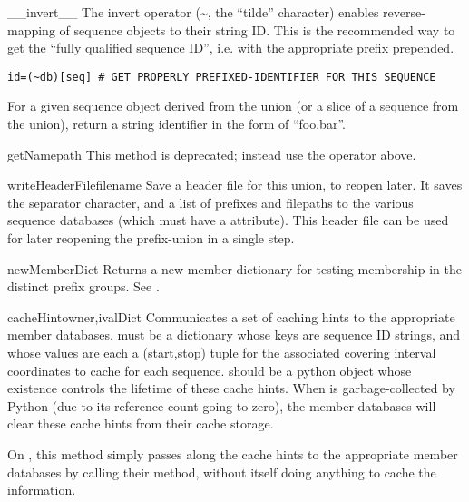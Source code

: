 \documentclass{howto}
\begin{document}
\begin{funcdesc}{__invert__}{}
  The invert operator (\textasciitilde, the ``tilde'' character) 
  enables reverse-mapping of sequence objects to their string ID.
  This is the recommended way to get the ``fully qualified sequence ID'', i.e. with
  the appropriate prefix prepended. 
\begin{verbatim}
id=(~db)[seq] # GET PROPERLY PREFIXED-IDENTIFIER FOR THIS SEQUENCE
\end{verbatim}
  For a given sequence object  derived from the union
  (or a slice of a sequence from the union), return a string identifier
  in the form of ``foo.bar''.  
\end{funcdesc}

\begin{funcdesc}{getName}{path}
  This method is deprecated; instead use the  operator
  above.
\end{funcdesc}

\begin{funcdesc}{writeHeaderFile}{filename}
  Save a header file for this union, to reopen later.
  It saves the separator character, and a list of prefixes
  and filepaths to the various sequence databases (which
  must have a  attribute).  This header
  file can be used for later reopening the prefix-union
  in a single step.
\end{funcdesc}

\begin{funcdesc}{newMemberDict}{}
  Returns a new member dictionary for testing membership in
  the distinct prefix groups.  See .
\end{funcdesc}

\begin{funcdesc}{cacheHint}{owner,ivalDict}
  Communicates a set of caching hints to the appropriate member
  databases.   must be a dictionary whose keys are
  sequence ID strings, and whose values are each a (start,stop) tuple
  for the associated covering interval coordinates to
  cache for each sequence.   should be a python object
  whose existence controls the lifetime of these cache hints.
  When  is garbage-collected by Python (due to its 
  reference count going to zero), the member databases will clear
  these cache hints from their cache storage.

  On , this method simply passes along
  the cache hints to the appropriate member databases by calling
  their  method, without itself doing anything
  to cache the information.
\end{funcdesc}
\end{document}
